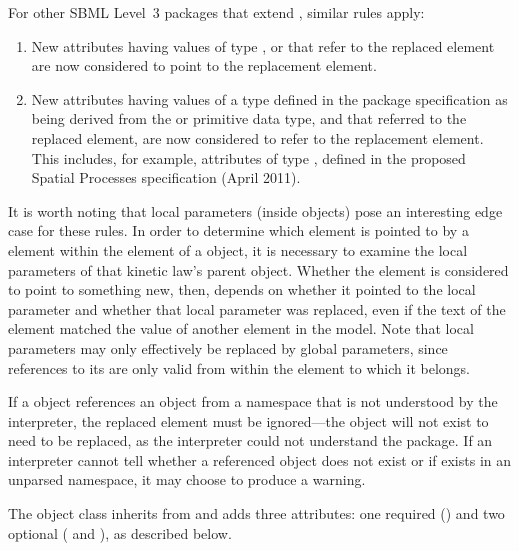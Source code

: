 For other SBML Level~3 packages that extend \sbmlthreecore, similar rules apply:

\begin{enumerate}

\item New attributes having values of type ,  or  that refer to the replaced element are now considered to point to the replacement element.

\item New attributes having values of a type defined in the package specification as being derived from the  or  primitive data type, and that referred to the replaced element, are now considered to refer to the replacement element. This includes, for example, attributes of type , defined in the proposed Spatial Processes specification (April 2011).

\end{enumerate}

It is worth noting that local parameters (inside \Reaction objects) pose an interesting edge case for these rules. In order to determine which element is pointed to by a  element within the  element of a \KineticLaw object, it is necessary to examine the local parameters of that kinetic law's parent \Reaction object.  Whether the  element is considered to point to something new, then, depends on whether it pointed to the local parameter and whether that local parameter was replaced, even if the text of the element matched the  value of another element in the model.  Note that local parameters may only effectively be replaced by global parameters, since references to its  are only valid from within the \Reaction element to which it belongs.

If a \ReplacedElement object references an object from a namespace that is not understood by the interpreter, the replaced element must be ignored---the object will not exist to need to be replaced, as the interpreter could not understand the package.  If an interpreter cannot tell whether a referenced object does not exist or if exists in an unparsed namespace, it may choose to produce a warning.

The \ReplacedElement object class inherits from \SBaseRef and adds three attributes: one required () and two optional ( and ), as described below.


